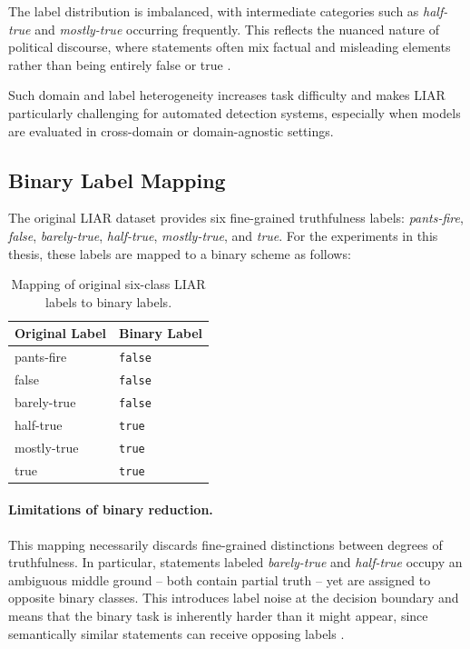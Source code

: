 The label distribution is imbalanced, with intermediate categories such as \textit{half-true} and \textit{mostly-true} occurring frequently. This reflects the nuanced nature of political discourse, where statements often mix factual and misleading elements rather than being entirely false or true \cite{wang2017liarliarpantsfire}.

Such domain and label heterogeneity increases task difficulty and makes LIAR particularly challenging for automated detection systems, especially when models are evaluated in cross-domain or domain-agnostic settings.

\subsection{Binary Label Mapping}

The original LIAR dataset provides six fine-grained truthfulness labels: \textit{pants-fire}, \textit{false}, \textit{barely-true}, 
\textit{half-true}, \textit{mostly-true}, and \textit{true}. For the experiments in this thesis, these labels are mapped to a binary scheme as follows:

\begin{table}[h]
\centering
\begin{tabular}{ll}
\toprule
Original Label & Binary Label \\
\midrule
pants-fire    & \texttt{false} \\
false         & \texttt{false} \\
barely-true   & \texttt{false} \\
\midrule
half-true     & \texttt{true} \\
mostly-true   & \texttt{true} \\
true          & \texttt{true} \\
\bottomrule
\end{tabular}
\caption{Mapping of original six-class LIAR labels to binary labels.}
\label{tab:label_mapping}
\end{table}

\paragraph{Limitations of binary reduction.}
This mapping necessarily discards fine-grained distinctions between degrees of truthfulness. In particular, statements labeled 
\textit{barely-true} and \textit{half-true} occupy an ambiguous middle ground -- both contain partial truth -- yet are assigned to opposite binary classes. This introduces label noise at the decision boundary and means that the binary task is inherently harder than it might appear, since semantically similar statements can receive opposing labels 
\cite{wang2017liarliarpantsfire}.

